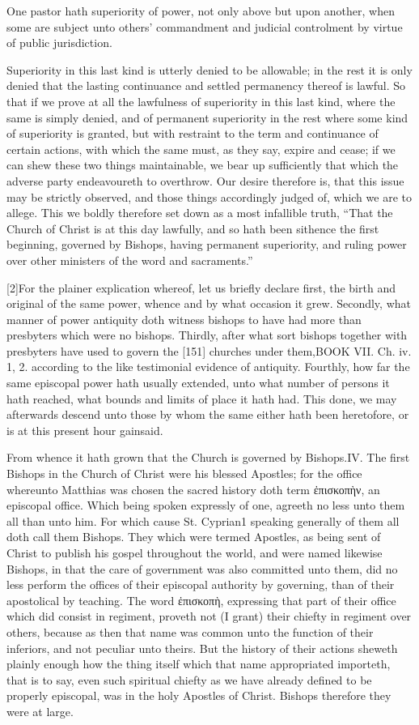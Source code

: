 One pastor hath superiority of power, not only above but upon another, when some are subject unto others’ commandment and judicial controlment by virtue of public jurisdiction.

Superiority in this last kind is utterly denied to be allowable; in the rest it is only denied that the lasting continuance and settled permanency thereof is lawful. So that if we prove at all the lawfulness of superiority in this last kind, where the same is simply denied, and of permanent superiority in the rest where some kind of superiority is granted, but with restraint to the term and continuance of certain actions, with which the same must, as they say, expire and cease; if we can shew these two things maintainable, we bear up sufficiently that which the adverse party endeavoureth to overthrow. Our desire therefore is, that this issue may be strictly observed, and those things accordingly judged of, which we are to allege. This we boldly therefore set down as a most infallible truth, “That the Church of Christ is at this day lawfully, and so hath been sithence the first beginning, governed by Bishops, having permanent superiority, and ruling power over other ministers of the word and sacraments.”

[2]For the plainer explication whereof, let us briefly declare first, the birth and original of the same power, whence and by what occasion it grew. Secondly, what manner of power antiquity doth witness bishops to have had more than presbyters which were no bishops. Thirdly, after what sort bishops together with presbyters have used to govern the [151] churches under them,BOOK VII. Ch. iv. 1, 2. according to the like testimonial evidence of antiquity. Fourthly, how far the same episcopal power hath usually extended, unto what number of persons it hath reached, what bounds and limits of place it hath had. This done, we may afterwards descend unto those by whom the same either hath been heretofore, or is at this present hour gainsaid.

From whence it hath grown that the Church is governed by Bishops.IV. The first Bishops in the Church of Christ were his blessed Apostles; for the office whereunto Matthias was chosen the sacred history doth term ἐπισκοπὴν, an episcopal office. Which being spoken expressly of one, agreeth no less unto them all than unto him. For which cause St. Cyprian1 speaking generally of them all doth call them Bishops. They which were termed Apostles, as being sent of Christ to publish his gospel throughout the world, and were named likewise Bishops, in that the care of government was also committed unto them, did no less perform the offices of their episcopal authority by governing, than of their apostolical by teaching. The word ἐπισκοπὴ, expressing that part of their office which did consist in regiment, proveth not (I grant) their chiefty in regiment over others, because as then that name was common unto the function of their inferiors, and not peculiar unto theirs. But the history of their actions sheweth plainly enough how the thing itself which that name appropriated importeth, that is to say, even such spiritual chiefty as we have already defined to be properly episcopal, was in the holy Apostles of Christ. Bishops therefore they were at large.

